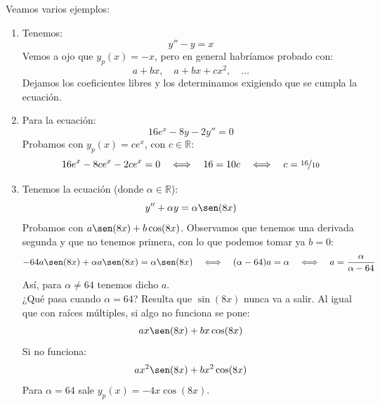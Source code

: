 \begin{ejemplo}
    Veamos varios ejemplos:
    \begin{enumerate}
        \item  Tenemos:
            \begin{equation*}
                y''  - y = x
            \end{equation*}
            Vemos a ojo que $y_p(x) = -x$, pero en general habríamos probado con:
            \begin{equation*}
                a+bx, \quad a+bx+cx^2, \quad \ldots
            \end{equation*}
            Dejamos los coeficientes libres y los determinamos exigiendo que se cumpla la ecuación.
        \item[3.] Para la ecuación:
            \begin{equation*}
                16e^x - 8y - 2 y'' = 0
            \end{equation*}
            Probamos con $y_p(x) = ce^x$, con $c\in \mathbb{R}$:
            \begin{equation*}
                16e^x - 8ce^x - 2ce^x = 0 \quad\Longleftrightarrow\quad 16 = 10c \quad\Longleftrightarrow\quad c = \nicefrac{16}{10}
            \end{equation*}
        \item[2.] Tenemos la ecuación (donde $\alpha\in \mathbb{R}$):
            \begin{equation*}
                y'' + \alpha y = \alpha \sen(8x)
            \end{equation*}
            Probamos con $a\sen(8x) + b\cos(8x)$. Observamos que tenemos una derivada segunda y que no tenemos primera, con lo que podemos tomar ya $b = 0$:
            \begin{equation*}
                -64a\sen(8x) + \alpha a\sen(8x) = \alpha\sen(8x) \quad\Longleftrightarrow\quad (\alpha-64)a= \alpha \quad\Longleftrightarrow\quad a = \frac{\alpha}{\alpha-64}
            \end{equation*}
            Así, para $\alpha \neq 64$ tenemos dicho $a$.\\

            \noindent
            ¿Qué pasa cuando $\alpha = 64$? Resulta que $\sin(8x)$ nunca va a salir. Al igual que con raíces múltiples, si algo no funciona se pone:
            \begin{equation*}
                ax\sen(8x) + bx\cos(8x)
            \end{equation*}
            Si no funciona:
            \begin{equation*}
                ax^2\sen(8x) + bx^2\cos(8x)
            \end{equation*}
            Para $\alpha = 64$ sale $y_p(x) = -4x\cos(8x)$.
    \end{enumerate}
\end{ejemplo}


